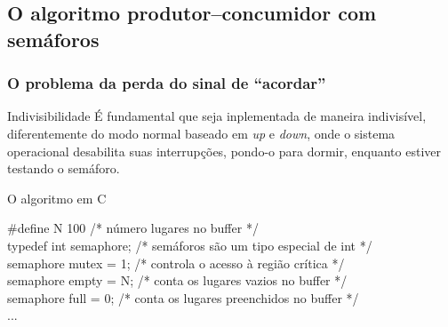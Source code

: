 \documentclass[11pt]{beamer}
\begin{document}
\subsection*{ O algoritmo produtor--concumidor com semáforos}
\begin{frame}\frametitle{ O problema da perda do sinal de ``acordar''}

\begin{block}{ Indivisibilidade}
 É fundamental que seja inplementada de maneira indivisível, diferentemente do modo normal baseado em \textit{up} e \textit{down}, onde 
 o sistema operacional desabilita suas interrupções, pondo-o para dormir, enquanto estiver testando o semáforo.
\end{block}

\pause
\begin{block}{ O algoritmo em C}
   \begin{algorithm}[H]
    \#define N 100		/* número lugares no buffer */ \\
    typedef int semaphore;	/* semáforos são um tipo especial de int */ \\
    semaphore mutex = 1;	/* controla o acesso à região crítica */\\
    semaphore empty = N;	/* conta os lugares vazios no buffer */\\
    semaphore full = 0;		/* conta os lugares preenchidos no buffer */\\
   ...
  \end{algorithm}
\end{block}

\end{frame}
\end{document}
